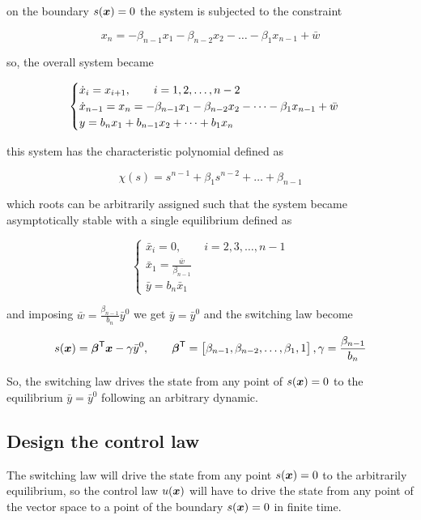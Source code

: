 on the boundary $s(\boldsymbol{x})=0$ the system is subjected to the constraint

\[
    x_n = - \beta_{n-1} x_1 - \beta_{n-2} x_2 - \dots - \beta_1 x_{n-1} + \bar w
\]

so, the overall system became

\[
    \begin{cases}
        \dot{x}_i = x_{i+1}, \qquad i = 1,2,\dots, n-2 \\
        \dot{x}_{n-1} = x_n = - \beta_{n-1} x_1 - \beta_{n-2} x_2 - \dots - \beta_1 x_{n-1} + \bar w \\
        y = b_n x_1 + b_{n-1} x_2 + \dots + b_1 x_n
    \end{cases}
\]

this system has the characteristic polynomial defined as

\[
    \chi(s) = s^{n-1} + \beta_1 s^{n-2} + \dots + \beta_{n-1}
\]

which roots can be arbitrarily assigned such that the system became asymptotically stable with a single equilibrium defined as

\[
    \begin{cases}
        \bar x_i = 0, \qquad i = 2,3,\dots, n-1 \\
        \bar x_1 = \frac{\bar w}{\beta_{n-1}} \\
        \bar y = b_n \bar x_1
    \end{cases}
\]

and imposing $\bar w = \frac{\beta_{n-1}}{b_n} \bar y^0$ we get $\bar y = \bar y^0$ and the switching law become

\begin{equation}
    s(\boldsymbol{x}) = \boldsymbol{\beta}^{\mathsf{T}} \boldsymbol{x} - \gamma \bar y^0, \qquad
    \boldsymbol{\beta}^{\mathsf{T}} = \begin{bmatrix}
                             \beta_{n-1}, \beta_{n-2}, \dots,  \beta_1, 1
    \end{bmatrix},
    \gamma = \frac{\beta_{n-1}}{b_n}
    \label{eqn:switching-law}
\end{equation}

So, the switching law drives the state from any point of $s(\boldsymbol{x})=0$ to the equilibrium $\bar y = \bar y^0$ following an arbitrary dynamic.

\subsection{Design the control law}

The switching law will drive the state from any point $s(\boldsymbol{x}) = 0$ to the arbitrarily equilibrium, so the control law $u(\boldsymbol{x})$ will have to drive the state from any point of the vector space to a point of the boundary $s(\boldsymbol{x}) = 0$ in finite time.

